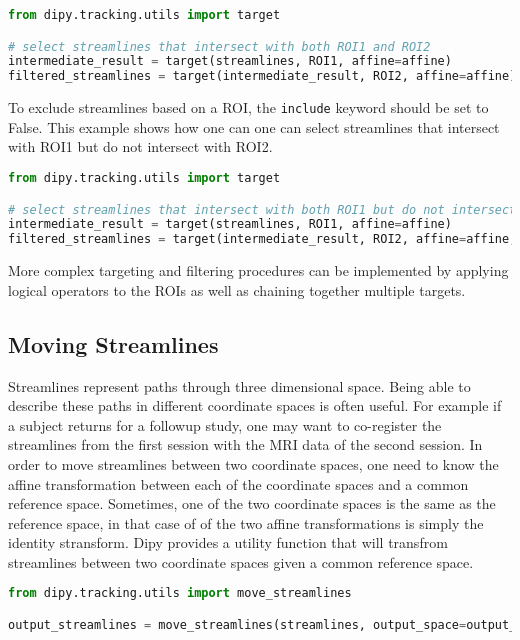 \begin{lstlisting}[language=python]
from dipy.tracking.utils import target

# select streamlines that intersect with both ROI1 and ROI2
intermediate_result = target(streamlines, ROI1, affine=affine)
filtered_streamlines = target(intermediate_result, ROI2, affine=affine)

\end{lstlisting}

To exclude streamlines based on a ROI, the \verb|include| keyword should be set to False. This example shows how one can one can select streamlines that intersect with ROI1 but do not intersect with ROI2.

\begin{lstlisting}[language=python]
from dipy.tracking.utils import target

# select streamlines that intersect with both ROI1 but do not intersect with ROI2
intermediate_result = target(streamlines, ROI1, affine=affine)
filtered_streamlines = target(intermediate_result, ROI2, affine=affine, include=False)

\end{lstlisting}

More complex targeting and filtering procedures can be implemented by applying logical operators to the ROIs as well as chaining together multiple targets.

\subsection{Moving Streamlines}

Streamlines represent paths through three dimensional space. Being able to describe these paths in different coordinate spaces is often useful. For example if a subject returns for a followup study, one may want to co-register the streamlines from the first session with the MRI data of the second session. In order to move streamlines between two coordinate spaces, one need to know the affine transformation between each of the coordinate spaces and a common reference space. Sometimes, one of the two coordinate spaces is the same as the reference space, in that case of of the two affine transformations is simply the identity stransform. Dipy provides a utility function that will transfrom streamlines between two coordinate spaces given a common reference space.

\begin{lstlisting}[language=python]
from dipy.tracking.utils import move_streamlines

output_streamlines = move_streamlines(streamlines, output_space=output_affine, input_space=input_affine)
\end{lstlisting}

